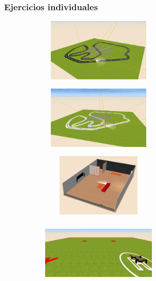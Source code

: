 \documentclass[xcolor={table}]{beamer}
\begin{document}
		\begin{frame}
			\frametitle{Ejercicios individuales}
	  \begin{figure}[ht]
        \centering
          \begin{subfigure}{\textwidth}
            \includegraphics[width=5.5cm, height=3cm]{img/pibot_vision.JPG}
        \label{fig:vision}
        \end{subfigure}\hfill
        \begin{subfigure}{\textwidth}
            \includegraphics[width=5.5cm, height=3cm]{img/siguelineas_ir.JPG}
        \label{fig:ir}
        \end{subfigure}\hfill
        \begin{subfigure}{\textwidth}
            \includegraphics[width=5.5cm, height=3cm]{img/bump&go.png}
        \label{fig:chocagira}
        \end{subfigure}\hfill
        \begin{subfigure}{\textwidth}
            \includegraphics[width=5.5cm, height=3cm]{img/cuadradoDrone.png}
        \label{fig:cuadrado}
        \end{subfigure}
            \label{fig:ejercicios}
            \end{figure}
         \end{frame}
		
\end{document}
